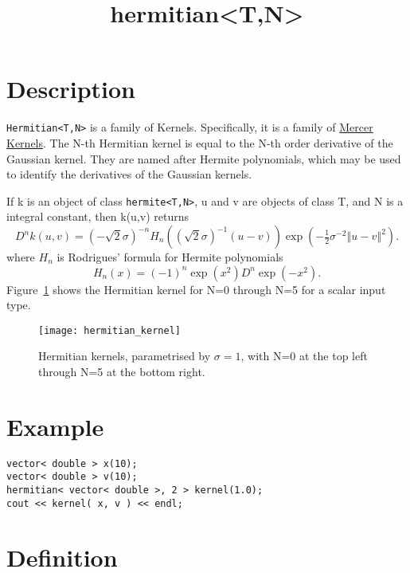 \documentclass{article}
\newcommand{\half}{\tfrac{1}{2}}
\begin{document}
\title{hermitian<T,N>}
\maketitle

\section*{Description}

\texttt{Hermitian<T,N>} is a family of Kernels. Specifically, it is a family of 
\href{\kmlroot/reference/mercer_kernel.html}{Mercer Kernels}. 
The N-th Hermitian kernel is equal to the N-th order derivative of the Gaussian kernel. 
They are named after Hermite polynomials, which may be used to identify the derivatives of the Gaussian kernels. 

If k is an object of class \texttt{hermite<T,N>}, u and v are objects of class T, and N is a integral constant, then k(u,v) returns
%
\begin{equation}
D^{n}k(u,v)=(-\sqrt{2}\sigma)^{-n}H_{n}((\sqrt{2}\sigma)^{-1}(u-v))\exp(-\half\sigma^{-2}\left\Vert u-v\right\Vert^{2}).
\end{equation}
%
where $H_n$ is Rodrigues' formula for Hermite polynomials
\begin{equation}
H_{n}(x)=(-1)^{n}\exp(x^{2})D^{n}\exp(-x^{2}).
\end{equation}
%
Figure~\ref{figure:hermitian_kernel} shows the Hermitian kernel for N=0 through N=5 for a scalar input type.

\begin{figure}
\texttt{[image: hermitian\_kernel]}
\caption{Hermitian kernels, parametrised by $\sigma=1$, with N=0 at the top left through N=5 at the bottom right.}
\label{figure:hermitian_kernel}
\end{figure}


\section*{Example}


\highlightcpp{}
\begin{verbatim}
vector< double > x(10);
vector< double > v(10);
hermitian< vector< double >, 2 > kernel(1.0);
cout << kernel( x, v ) << endl;
\end{verbatim}


\section*{Definition}
\end{document}
